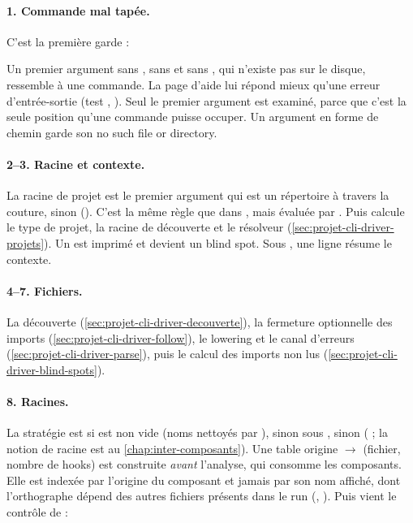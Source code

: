 \paragraph{1. Commande mal tapée.} C'est la première garde :


Un premier argument sans \code{/}, sans \code{\textbackslash} et sans , qui n'existe pas sur le disque, ressemble à une commande. La page d'aide lui répond mieux qu'une erreur d'entrée-sortie (test , ). Seul le premier argument est examiné, parce que c'est la seule position qu'une commande puisse occuper. Un argument en forme de chemin garde son \og no such file or directory\fg{}.

\paragraph{2--3. Racine et contexte.} La racine de projet est le premier argument qui est un répertoire à travers la couture, sinon  (). C'est la même règle que dans , mais évaluée par . Puis  calcule le type de projet, la racine de découverte et le résolveur (\cref{sec:projet-cli-driver-projets}). Un  est imprimé et devient un blind spot. Sous , une ligne résume le contexte.

\paragraph{4--7. Fichiers.} La découverte (\cref{sec:projet-cli-driver-decouverte}), la fermeture optionnelle des imports (\cref{sec:projet-cli-driver-follow}), le lowering et le canal d'erreurs (\cref{sec:projet-cli-driver-parse}), puis le calcul des imports non lus (\cref{sec:projet-cli-driver-blind-spots}).

\paragraph{8. Racines.} La stratégie est  si  est non vide (noms nettoyés par ), sinon  sous , sinon  ( ; la notion de racine est au \cref{chap:inter-composants}). Une table \og origine $\to$ (fichier, nombre de hooks)\fg{} est construite \emph{avant} l'analyse, qui consomme les composants. Elle est indexée par l'origine  du composant et jamais par son nom affiché, dont l'orthographe dépend des autres fichiers présents dans le run (, ). Puis vient le contrôle de  :

